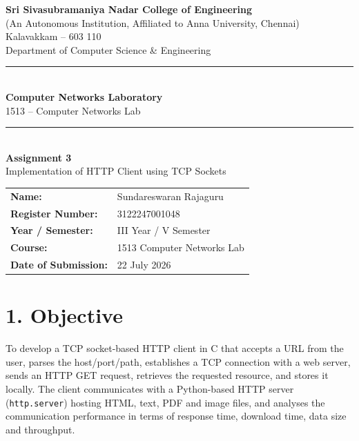 \documentclass[11pt]{article}
\title{\vspace{-2cm}}
\date{}
\begin{document}
\begin{titlepage}
\centering
\vspace*{1cm}
{\large \textbf{Sri Sivasubramaniya Nadar College of Engineering}}\\
{\small (An Autonomous Institution, Affiliated to Anna University, Chennai)}\\
{\small Kalavakkam -- 603 110}\\[0.3cm]
{\small Department of Computer Science \& Engineering}\\[1.5cm]

\rule{\linewidth}{0.5mm}\\[0.4cm]
{\LARGE \textbf{Computer Networks Laboratory}}\\[0.3cm]
{\Large 1513 -- Computer Networks Lab}\\[0.4cm]
\rule{\linewidth}{0.5mm}\\[1.5cm]

{\huge \textbf{Assignment 3}}\\[0.4cm]
{\Large Implementation of HTTP Client using TCP Sockets}\\[2cm]

\begin{center}
\begin{tabular}{ll}
\textbf{Name:} & Sundareswaran Rajaguru \\[0.2cm]
\textbf{Register Number:} & 3122247001048 \\[0.2cm]
\textbf{Year / Semester:} & III Year / V Semester \\[0.2cm]
\textbf{Course:} & 1513 Computer Networks Lab \\[0.2cm]
\textbf{Date of Submission:} & 22 July 2026 \\[0.2cm]
\end{tabular}
\end{center}

\vfill
\end{titlepage}

\section*{1. Objective}
To develop a TCP socket-based HTTP client in C that accepts a URL from the user, parses the
host/port/path, establishes a TCP connection with a web server, sends an HTTP GET request,
retrieves the requested resource, and stores it locally. The client communicates with a
Python-based HTTP server (\texttt{http.server}) hosting HTML, text, PDF and image files, and
analyses the communication performance in terms of response time, download time, data size and
throughput.
\end{document}
